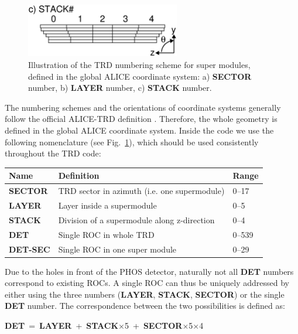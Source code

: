 \documentclass{alicetdr}
\begin{document}
\begin{figure}[htb]
\begin{minipage}[b]{0.49\textwidth}
\begin{center}
\vspace{1.4cm}
\end{center}
\end{minipage}
\begin{center}
\includegraphics[width=0.60\textwidth]{plots/stack_numbering.eps}
\end{center}
\caption{
Illustration of the TRD numbering scheme for super modules, defined in
the global ALICE coordinate system: a) {\bf SECTOR} number, b)
{\bf LAYER} number, c) {\bf STACK} number.
}
\label{FIG_GEO:sm_numbering}
\end{figure}
%
The numbering schemes and the orientations of coordinate systems generally
follow the official ALICE-TRD definition \cite{DAVID}.  Therefore, the
whole geometry is defined in the global ALICE coordinate system.
%
Inside the code we use the following nomenclature (see
Fig.~\ref{FIG_GEO:sm_numbering}), which should be used consistently
throughout the TRD code:
%
\begin{center}
\begin{tabular}{l|l|l}
Name          & Definition                                   & Range  \\ \hline
{\bf SECTOR}  & TRD sector in azimuth (i.e. one supermodule) & 0--17  \\
{\bf LAYER}   & Layer inside a supermodule                   & 0--5   \\
{\bf STACK}   & Division of a supermodule along z-direction  & 0--4   \\
{\bf DET}     & Single ROC in whole TRD                      & 0--539 \\
{\bf DET-SEC} & Single ROC in one super module               & 0--29
\end{tabular}
\end{center}
%
Due to the holes in front of the PHOS detector, naturally not all {\bf DET}
numbers correspond to existing ROCs.  A single ROC can thus be uniquely
addressed by either using the three numbers
({\bf LAYER}, {\bf STACK}, {\bf SECTOR}) or the single {\bf DET} number.
The correspondence between the two possibilities is defined as:
\begin{center}
\mbox{{\bf DET} = {\bf LAYER} + {\bf STACK}$\times$5 + {\bf SECTOR}$\times$5$\times$4}
\end{center}
\end{document}
